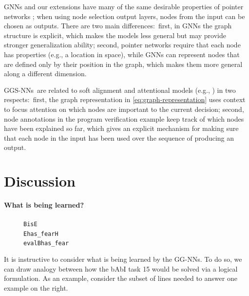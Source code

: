\documentclass{article} %
\newcommand{\OurMethodMinorShort}{GG-NN}
\newcommand{\OurMethodMinorShorts}{\OurMethodMinorShort s}
\newcommand{\OurMethodShort}{GGS-NN}
\newcommand{\OurMethodShorts}{\OurMethodShort s}
\begin{document}
GNNs and our extensions have many of the same desirable properties of
pointer networks \citep{vinyals2015pointer};  when using
node selection output layers, nodes from the input can be chosen as outputs.
There are two main differences:~first,
in GNNs the graph structure is explicit, which makes the models less general
but may provide stronger generalization ability; 
second, pointer networks require that each node has
properties (e.g., a location in space), while GNNs can represent
nodes that are defined only by their position in the graph, which 
makes them more general along a different dimension.

\OurMethodShorts~are related to soft alignment and attentional models
(e.g., \cite{bahdanau2014neural,kumar2015ask,sukhbaatar2015end}) in two respects:~first, the graph
representation in \eqref{eq:graph-representation} uses context to
focus attention on which nodes are important to the current decision;
second, node annotations in the program verification example keep
track of which nodes have been explained so far, which gives an
explicit mechanism for making sure that each node in the input
has been used over the sequence of producing an output.



\section{Discussion}
\label{sec:discussion}

\paragraph{What is being learned?}

\begin{figure}
\small\vspace{-4ex}
\begin{alltt}
 B is E
 E has_fear H
 eval B has_fear
\end{alltt}
\end{figure}
It is instructive to consider what is being learned by the
\OurMethodMinorShorts. To do so, we can draw analogy between how the bAbI task 15
would be solved via
a logical formulation. As an example, consider the subset of lines
needed to answer one example on the right.

 
\end{document}
